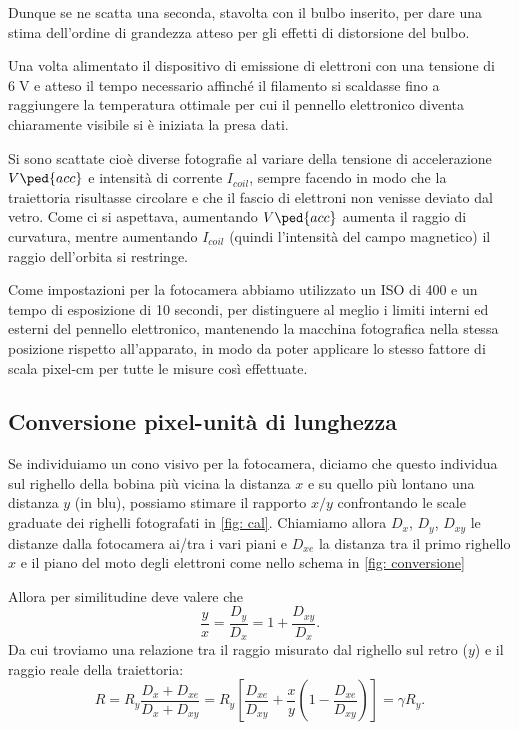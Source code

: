 \documentclass[10pt, a4paper, italian]{article}
\begin{document}
Dunque se ne scatta una seconda, stavolta con il bulbo inserito, per dare una
stima dell'ordine di grandezza atteso per gli effetti di distorsione del
bulbo.

Una volta alimentato il dispositivo di emissione di elettroni con una tensione
di $6 \; \si{\V}$ e atteso il tempo necessario affinché il filamento si
scaldasse fino a raggiungere la temperatura ottimale per cui il pennello
elettronico diventa chiaramente visibile si è iniziata la presa dati.

Si sono scattate cioè diverse fotografie al variare della tensione di
accelerazione $V\ped{acc}$ e intensità di corrente $I_{coil}$, sempre facendo
in modo che la traiettoria risultasse circolare e che il fascio di elettroni
non venisse deviato dal vetro. Come ci si aspettava, aumentando $V\ped{acc}$
aumenta il raggio di curvatura, mentre aumentando $I_{coil}$ (quindi
l'intensità del campo magnetico) il raggio dell'orbita si restringe.

Come impostazioni per la fotocamera abbiamo utilizzato un ISO di 400 e
un tempo di esposizione di 10 secondi, per distinguere al meglio i limiti
interni ed esterni del pennello elettronico, mantenendo la macchina fotografica
nella stessa posizione rispetto all'apparato, in modo da poter applicare lo
stesso fattore di scala pixel-cm per tutte le misure così effettuate.

\subsection{Conversione pixel-unità di lunghezza}
\label{sec: conv}
Se individuiamo un cono visivo per la fotocamera, diciamo che questo individua
sul righello della bobina più vicina la distanza $x$ e su quello più lontano
una distanza $y$ (in blu), possiamo stimare il rapporto $x/y$ confrontando le
scale graduate dei righelli fotografati in \ref{fig: cal}.
Chiamiamo allora $D_x$, $D_y$, $D_{xy}$ le distanze dalla fotocamera ai/tra i
vari piani e $D_{xe}$ la distanza tra il primo righello $x$ e il piano del
moto degli elettroni come nello schema in \ref{fig: conversione}

Allora per similitudine deve valere che
\[
\frac{y}{x} =
\frac{D_y}{D_x} = 1 + \frac{D_{xy}}{D_x}
.\]
Da cui troviamo una relazione tra il raggio misurato dal righello sul retro
($y$) e il raggio reale della traiettoria:
\[
    R = R_y \frac{D_x + D_{xe}}{D_x + D_{xy}} =
    R_y \left[\frac{D_{xe}}{D_{xy}} +
    \frac{x}{y} \left(1 - \frac{D_{xe}}{D_{xy}}\right) \right] = \gamma R_{y}.
\]
\end{document}
